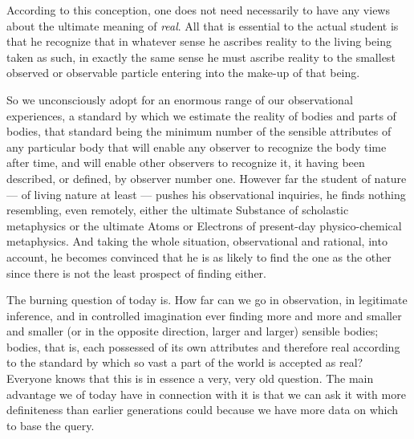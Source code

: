 \documentclass[a4paper, 11pt, oneside, polutonikogreek, english]{article}
\begin{document}
According to this conception, one does not need necessarily to have any views about the ultimate meaning of \emph{real}. All that is essential to the actual student is that he recognize that in whatever sense he ascribes reality to the living being taken as such, in exactly the same sense he must ascribe reality to the smallest observed or observable particle entering into the make-up of that being.

So we unconsciously adopt for an enormous range of our observational experiences, a standard by which we estimate the reality of bodies and parts of bodies, that standard being the minimum number of the sensible attributes of any particular body that will enable any observer to recognize the body time after time, and will enable other observers to recognize it, it having been described, or defined, by observer number one. However far the student of nature --- of living nature at least --- pushes his observational inquiries, he finds nothing resembling, even remotely, either the ultimate Substance of scholastic metaphysics or the ultimate Atoms or Electrons of present-day physico-chemical metaphysics. And taking the whole situation, observational and rational, into account, he becomes convinced that he is as likely to find the one as the other since there is not the least prospect of finding either.

The burning question of today is. How far can we go in observation, in legitimate inference, and in controlled imagination ever finding more and more and smaller and smaller (or in the opposite direction, larger and larger) sensible bodies; bodies, that is, each possessed of its own attributes and therefore real according to the standard by which so vast a part of the world is accepted as real? Everyone knows that this is in essence a very, very old question. The main advantage we of today have in connection with it is that we can ask it with more definiteness than earlier generations could because we have more data on which to base the query.

\subsection{}
\end{document}
